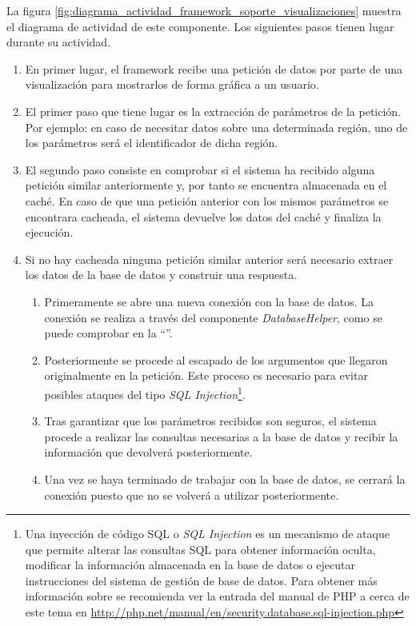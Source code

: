 La figura \ref{fig:diagrama_actividad_framework_soporte_visualizaciones} muestra el diagrama de actividad de este componente.  Los siguientes pasos tienen lugar durante su actividad.
\begin{enumerate}
	\item  En primer lugar, el framework recibe una petición de datos por parte de una visualización para mostrarlos de forma gráfica a un usuario.
	\item  El primer paso que tiene lugar es la extracción de parámetros de la petición.  Por ejemplo: en caso de necesitar datos sobre una determinada región, uno de los parámetros será el identificador de dicha región.
	\item  El segundo paso consiste en comprobar si el sistema ha recibido alguna petición similar anteriormente y, por tanto se encuentra almacenada en el caché.  En caso de que una petición anterior con los mismos parámetros se encontrara cacheada, el sistema devuelve los datos del caché y finaliza la ejecución.
	\item  Si no hay cacheada ninguna petición similar anterior será necesario extraer los datos de la base de datos y construir una respuesta.
		\begin{enumerate}
			\item  Primeramente se abre una nueva conexión con la base de datos.  La conexión se realiza a través del componente \textit{DatabaseHelper}, como se puede comprobar en la ``''.
			\item  Posteriormente se procede al escapado de los argumentos que llegaron originalmente en la petición.  Este proceso es necesario para evitar posibles ataques del tipo \textit{SQL Injection}\footnote{Una inyección de código SQL o \textit{SQL Injection} es un mecanismo de ataque que permite alterar las consultas SQL para obtener información oculta, modificar la información almacenada en la base de datos o ejecutar instrucciones del sistema de gestión de base de datos.  Para obtener más información sobre se recomienda ver la entrada del manual de PHP a cerca de este tema en \url{http://php.net/manual/en/security.database.sql-injection.php}}.
			\item  Tras garantizar que los parámetros recibidos son seguros, el sistema procede a realizar las consultas necesarias a la base de datos y recibir la información que devolverá posteriormente.
			\item  Una vez se haya terminado de trabajar con la base de datos, se cerrará la conexión puesto que no se volverá a utilizar posteriormente.

\end{enumerate}
\end{enumerate}
